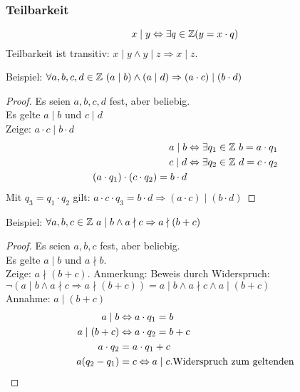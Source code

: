 \subsubsection{Teilbarkeit}
\begin{equation*}
	x \mid y \Leftrightarrow \exists q \in \mathbb{Z} (y = x \cdot q)
\end{equation*}
Teilbarkeit ist transitiv: $x \mid y \wedge y \mid z \Rightarrow x \mid z$.

Beispiel: $\forall a, b, c, d \in \mathbb{Z}\ (a \mid b) \wedge (a \mid d) \Rightarrow (a \cdot c) \mid (b \cdot d)$
\begin{proof}
	Es seien $a, b, c, d$ fest, aber beliebig.\\
	Es gelte $a \mid b$ und $c \mid d$\\
	Zeige: $a \cdot c \mid b \cdot d$\\
	\begin{align*}
		a \mid b & \Leftrightarrow \exists q_1 \in \mathbb{Z}\ b = a \cdot q_1\\
		c \mid d & \Leftrightarrow \exists q_2 \in \mathbb{Z}\ d = c \cdot q_2\\
		(a \cdot q_1) \cdot (c \cdot q_2) = b \cdot d\\
	\end{align*}
Mit $q_3 = q_1 \cdot q_2$ gilt: $a \cdot c \cdot q_3 = b \cdot d \Rightarrow (a \cdot c) \mid (b \cdot d)$\qedhere
\end{proof}

Beispiel: $\forall a, b, c \in \mathbb{Z}\ a \mid b \wedge a \nmid c \Rightarrow a \nmid (b + c)$
\begin{proof}
	Es seien $a, b, c$ fest, aber beliebig.\\
	Es gelte $a \mid b$ und $a \nmid b$.\\
	Zeige: $a \nmid (b + c)$.
	Anmerkung: Beweis durch Widerspruch: $\neg (a \mid b \wedge a \nmid c \Rightarrow a \nmid (b + c)) = a \mid b \wedge a \nmid c \wedge a \mid (b + c)$\\
	Annahme: $a \mid (b + c)$\\
	\begin{align*}
		a \mid b& \Leftrightarrow a \cdot q_1 = b\\
		a \mid (b + c) & \Leftrightarrow a \cdot q_2 = b + c\\
		a \cdot q_2& = a \cdot q_1 + c\\
		a (q_2 - q_1)& = c \Leftrightarrow a \mid c. \mbox{Widerspruch zum geltenden}\qedhere
	\end{align*}
\end{proof}

